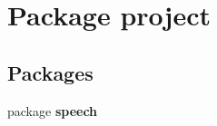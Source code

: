 \section{Package project}
\label{namespaceproject}
\subsection*{Packages}
\begin{DoxyCompactItemize}
\item 
package {\bf speech}
\end{DoxyCompactItemize}
